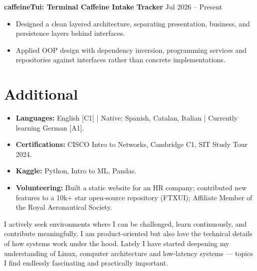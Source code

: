 \documentclass[11pt, a4paper]{article}
\begin{document}
\vspace{0.8em}

\textbf{caffeineTui: Terminal Caffeine Intake Tracker} \hfill Jul 2026 -- Present
\begin{itemize}
    \item Designed a clean layered architecture, separating presentation, business, and persistence layers behind interfaces.
    \item Applied OOP design with dependency inversion, programming services and repositories against interfaces rather than concrete implementations.
\end{itemize}

\section{Additional}
\begin{itemize}
    \item \textbf{Languages:} English [C1] | Native: Spanish, Catalan, Italian | Currently learning German [A1].
    \item \textbf{Certifications:} CISCO Intro to Networks, Cambridge C1, SIT Study Tour 2024.
    \item \textbf{Kaggle:} Python, Intro to ML, Pandas.
    \item \textbf{Volunteering:} Built a static website for an HR company; contributed new features to a 10k+ star open-source repository (FTXUI); Affiliate Member of the Royal Aeronautical Society.
\end{itemize}

\vspace{0.4em}
\begin{flushleft}
{\small I actively seek environments where I can be challenged, learn continuously, and contribute meaningfully. I am product-oriented but also love the technical details of how systems work under the hood. Lately I have started deepening my understanding of Linux, computer architecture and low-latency systems — topics I find endlessly fascinating and practically important.}
\end{flushleft}
\end{document}
